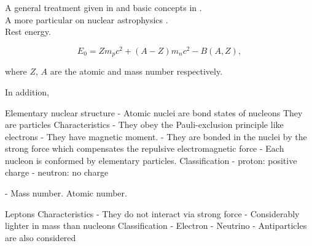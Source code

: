 \documentclass[openany]{book}
\begin{document}
A general treatment given in \cite{basdevant_rich_spiro_2004} and basic concepts in \cite{heyde_2020}. \\

A more particular on nuclear astrophysics \cite{iliadis_2015}. \\

Rest energy.

\begin{equation} \label{eq:restEnergy}
	E_0 = Zm_pc^2 + (A-Z)m_nc^2 - B(A, Z),
\end{equation}

where $Z$, $A$ are the atomic and mass number respectively. 



In addition, 

Elementary nuclear structure 
-	Atomic nuclei are bond states of nucleons 
They are particles
Characteristics 
-	They obey the Pauli-exclusion principle like electrons
- 	They have magnetic moment.
-	They are bonded in the nuclei by the strong force which compensates the repulsive electromagnetic force
-	Each nucleon is conformed by elementary particles.
Classification 
-	proton: positive charge
-	neutron: no charge  

-	Mass number. Atomic number.

Leptons 
Characteristics
-	They do not interact via strong force
-	Considerably lighter in mass than nucleons
Classification 
-	Electron 
-	Neutrino 
-	Antiparticles are also considered



\end{document}
